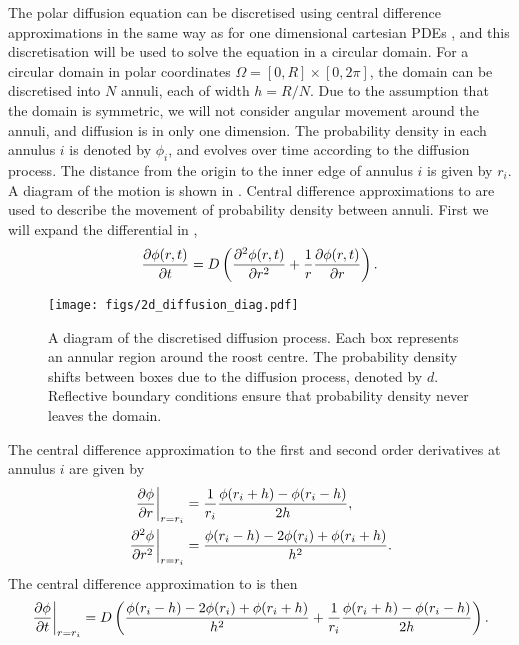 The polar diffusion equation can be discretised using central difference approximations in the same way as for one dimensional cartesian PDEs \cite{mori2015numerical,galeriu2004modeling,britt2010compact}, and this discretisation will be used to solve the equation in a circular domain. For a circular domain in polar coordinates $\Omega = [0,R] \times [0, 2\pi]$, the domain can be discretised into $N$ annuli, each of
width $h=R/N$. Due to the assumption that the domain is symmetric, we will not consider angular movement around the annuli, and diffusion is in only one dimension. The probability density in each annulus $i$ is denoted by $\phi_i$, and evolves over time according to the diffusion process.  The distance from the origin to the inner edge of annulus $i$ is given by $r_i$. A diagram of the motion is shown in . Central difference approximations to  are used to describe the movement of probability density between annuli. First we will expand the differential in ,
\begin{equation}
\frac{\partial  \phi(r,t)}{\partial t} = D \left(\frac{\partial^2 \phi(r,t)}{\partial r^2} + \frac{1}{r}\frac{\partial \phi(r,t)}{\partial r} \right).
\label{eqn:diffusion_polar2d_expand}
\end{equation}
%
\begin{figure} [t]
\centering
    \texttt{[image: figs/2d\_diffusion\_diag.pdf]}
    \caption{A diagram of the discretised diffusion process. Each box represents an annular region around the roost centre. The probability density shifts between boxes due to the diffusion process, denoted by $d$. Reflective boundary conditions ensure that probability density never leaves the domain.}
\label{fig:2d_diffusion_diag}
\end{figure}
%
The central difference approximation to the first and second order derivatives at annulus $i$ are given by
%
\begin{align}
 \left.\frac{\partial \phi}{\partial r}\right|_{r=r_i}&= \frac{1}{r_i}\frac{\phi(r_i+h)-\phi(r_i-h)}{2h}, \\
 \left.\frac{\partial^2 \phi}{\partial r^2}\right|_{r=r_i}&= \frac{\phi(r_i-h)-2\phi(r_i)+\phi(r_i+h)}{h^2}. \label{eqn:diffusion_discretei}
\end{align}
%
The central difference approximation to  is then
%
\begin{equation}
 \left.\frac{\partial \phi}{\partial t}\right|_{r=r_i} = D \left(\frac{\phi(r_i-h)-2\phi(r_i)+\phi(r_i+h)}{h^2} + \frac{1}{r_i} \frac{\phi(r_i+h)-\phi(r_i-h)}{2 h} \right).
 \label{eqn:diffusion_polar_cd}
\end{equation}
